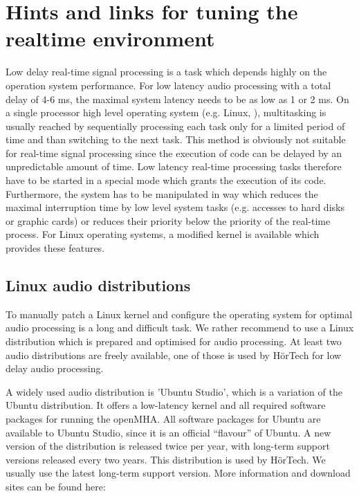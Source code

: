\section{Hints and links for tuning the realtime environment}%
\label{sec:system}%

Low delay real-time signal processing is a task which depends highly on
the operation system performance. For low latency audio processing
with a total delay of 4-6 ms, the maximal system latency needs to be
as low as 1 or 2 ms.  On a single processor high level operating
system (e.g. Linux, \Windows{}), multitasking is usually reached by
sequentially processing each task only for a limited period of time
and than switching to the next task. This method is obviously not
suitable for real-time signal processing since the execution of code
can be delayed by an unpredictable amount of time. Low latency
real-time processing tasks therefore have to be started in a special
mode which grants the execution of its code. Furthermore, the system
has to be manipulated in way which reduces the maximal interruption
time by low level system tasks (e.g. accesses to hard disks or graphic
cards) or reduces their priority below the priority of the real-time
process. For Linux operating systems, a modified kernel is available
which provides these features.

\subsection{Linux audio distributions}

To manually patch a Linux kernel and configure the operating system
for optimal audio processing is a long and difficult task. We rather
recommend to use a Linux distribution which is prepared and optimised
for audio processing. At least two audio distributions are freely
available, one of those is used by H\"orTech for low delay audio
processing.

A widely used audio distribution is 'Ubuntu Studio',
which is a variation of the Ubuntu distribution.
%
It offers a low-latency kernel and all required software packages for
running the openMHA.
%
All software packages for Ubuntu are available to Ubuntu Studio, since
it is an official ``flavour'' of Ubuntu.
%
A new version of the distribution is released twice per year, with
long-term support versions released every two years.
%
This distribution is used by H\"orTech.
%
We usually use the latest long-term support version.
%
More information and download sites can be found here:

